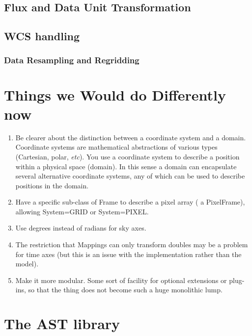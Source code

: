 \documentclass[final,authoryear,5p,times,twocolumn]{elsarticle}
\begin{document}
\subsection{Flux and Data Unit Transformation}

\subsection{WCS handling}

\subsubsection{Data Resampling and Regridding}





\section{Things we Would do Differently now}

\begin{enumerate}

\item Be clearer about the distinction between a coordinate system and
  a domain. Coordinate systems are mathematical abstractions of
  various types (Cartesian, polar, \emph{etc}). You use a coordinate system
  to describe a position within a physical space (domain). In this
  sense a domain can encapsulate several alternative coordinate
  systems, any of which can be used to describe positions in the
  domain.

\item Have a specific sub-class of Frame to describe a pixel array ( a
  PixelFrame), allowing System=GRID or System=PIXEL.

\item Use degrees instead of radians for sky axes.

\item The restriction that Mappings can only transform doubles may be
  a problem for time axes (but this is an issue with the
  implementation rather than the model).

\item Make it more modular. Some sort of facility for optional
  extensions or plug-ins, so that the thing does not become such a
  huge monolithic lump.

\end{enumerate}

\section{The AST library}
\end{document}
